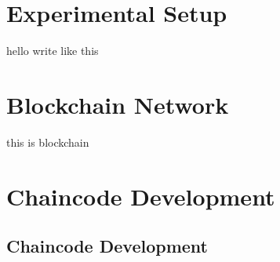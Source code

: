 \section{ Experimental Setup}
\noindent hello write like this 

\section{Blockchain Network}
\noindent this is blockchain 

\section{Chaincode Development}
\lipsum[22-25]
\subsection{Chaincode Development}
\lipsum[22-25]







